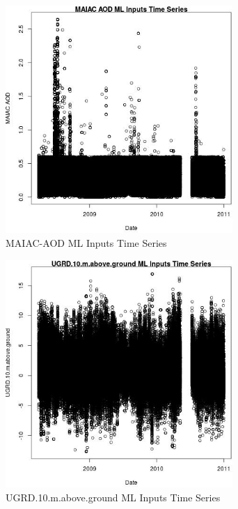 \begin{figure} 
\centering  
\includegraphics[width=0.77\textwidth]{Code_Outputs/ML_input_report_ML_input_PM25_Step5_part_d_de_duplicated_aves_ML_inputpdfs_MAIAC_AODvDate.jpg} 
\caption{\label{fig:ML_input_report_ML_input_PM25_Step5_part_d_de_duplicated_aves_ML_inputpdfsMAIAC_AODvDate}MAIAC-AOD ML Inputs Time Series} 
\end{figure} 
 

\begin{figure} 
\centering  
\includegraphics[width=0.77\textwidth]{Code_Outputs/ML_input_report_ML_input_PM25_Step5_part_d_de_duplicated_aves_ML_inputpdfs_UGRD10mabovegroundvDate.jpg} 
\caption{\label{fig:ML_input_report_ML_input_PM25_Step5_part_d_de_duplicated_aves_ML_inputpdfsUGRD10mabovegroundvDate}UGRD.10.m.above.ground ML Inputs Time Series} 
\end{figure} 
 

